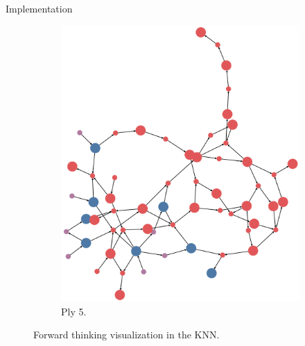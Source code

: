 \documentclass[final]{beamer} %
\begin{document}
\begin{columns}
\begin{column}{.35\textwidth}
\begin{block}{Implementation}
\begin{figure}[!htb]
\begin{subfigure}[!htb]{0.18\columnwidth}
				\includegraphics[width=\columnwidth]{figures/knn_forward_think_5.png}
				\caption{Ply 5.}
			\end{subfigure}
			\caption{Forward thinking visualization in the KNN.}
		\end{figure}
	

\end{block}
\end{column}
\end{columns}
\end{document}
